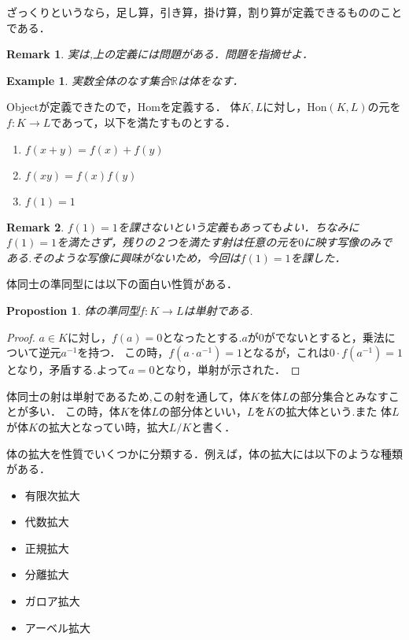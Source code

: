 \documentclass{ujarticle}
\newtheorem{prop}[thm]{Propostion}
\newtheorem{epl}[thm]{Example}
\newtheorem*{rem}{Remark}
\begin{document}
ざっくりというなら，足し算，引き算，掛け算，割り算が定義できるもののことである．
\begin{rem}
 実は,上の定義には問題がある．問題を指摘せよ．
\end{rem}
\begin{epl}
 実数全体のなす集合$\mathbb{R}$は体をなす．
\end{epl}

Objectが定義できたので，Homを定義する．
体$K,L$に対し，$\mathrm{Hon}(K,L)$の元を$f:K \to L$であって，以下を満たすものとする．
\begin{enumerate}
  \item $f(x + y)= f(x) + f(y)$
  \item $f(xy)=f(x)f(y)$
  \item $f(1)=1$
\end{enumerate}
\begin{rem}
 $f(1)=1$を課さないという定義もあってもよい．ちなみに$f(1)=1$を満たさず，残りの２つを満たす射は任意の元を$0$に映す写像のみである.そのような写像に興味がないため，今回は$f(1)=1$を課した．
\end{rem}
体同士の準同型には以下の面白い性質がある．
\begin{prop}
 体の準同型$f:K \to L$は単射である.
\end{prop}
\begin{proof}
  $a \in K$に対し，$f(a)=0$となったとする.$a$が$0$がでないとすると，乗法について逆元$a^{-1}$を持つ．
  この時，$f(a \cdot a^{-1})=1$となるが，これは$0 \cdot f(a^{-1})=1$となり，矛盾する.よって$a=0$となり，単射が示された．
\end{proof}
体同士の射は単射であるため,この射を通して，体$K$を体$L$の部分集合とみなすことが多い．
この時，体$K$を体$L$の部分体といい，$L$を$K$の拡大体という.また
体$L$が体$K$の拡大となってい時，拡大$L/K$と書く．

体の拡大を性質でいくつかに分類する．例えば，体の拡大には以下のような種類がある．
\begin{itemize}
  \item 有限次拡大
  \item 代数拡大
  \item 正規拡大
  \item 分離拡大
  \item ガロア拡大
  \item アーベル拡大
\end{itemize}
\end{document}

